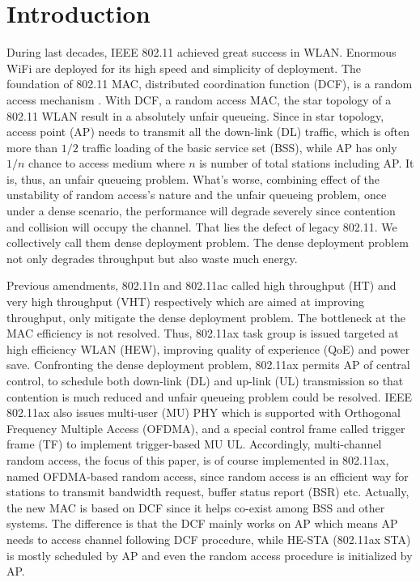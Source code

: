 \chapter{Introduction}
\label{c:intro}

During last decades, IEEE 802.11 achieved great success in WLAN. Enormous WiFi are deployed for its high speed and simplicity of deployment. 
The foundation of 802.11 MAC, distributed coordination function (DCF), is a random access mechanism \cite{bianchi2000performance}.
With DCF, a random access MAC, the star topology of a 802.11 WLAN result in a absolutely unfair queueing. 
Since in star topology,  access point (AP) needs to transmit all the down-link (DL) traffic, which is often more than $1/2$ traffic loading of the basic service set (BSS), while AP has only $1/n$ chance to access medium where $n$ is number of total stations including AP. It is, thus, an unfair queueing problem.
What's worse, combining effect of the unstability of random access's nature and the unfair queueing problem, once under a dense scenario, the performance will degrade severely since contention and collision will occupy the channel.
That lies the defect of legacy 802.11.
We collectively call them dense deployment problem.
The dense deployment problem not only degrades throughput but also waste much energy.

Previous amendments, 802.11n and 802.11ac called high throughput (HT) and very high throughput (VHT) respectively which are aimed at improving throughput, only mitigate the dense deployment problem. 
The bottleneck at the MAC efficiency is not resolved.
Thus, 802.11ax task group is issued targeted at high efficiency WLAN (HEW), improving quality of experience (QoE) and power save.
Confronting the dense deployment problem, 802.11ax permits AP of central control, to schedule both down-link (DL) and up-link (UL) transmission so that contention is much reduced and unfair queueing problem could be resolved.
IEEE 802.11ax also issues multi-user (MU) PHY which is supported with Orthogonal Frequency Multiple Access (OFDMA), and a special control frame called trigger frame (TF) to implement trigger-based MU UL\cite{draft_ax}. %
Accordingly, multi-channel random access, the focus of this paper, is of course implemented in 802.11ax, named OFDMA-based random access, since random access is an efficient way for stations to transmit bandwidth request, buffer status report (BSR) etc. 
Actually, the new MAC is based on DCF since it helps co-exist among BSS and other systems. The difference is that the DCF mainly works on AP which means AP needs to access channel following DCF procedure, while HE-STA (802.11ax STA) is mostly scheduled by AP and even the random access procedure is initialized by AP. 

